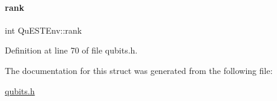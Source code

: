 \mbox{\label{structQuESTEnv_aa648bb336cf8598467cb62db00b9cee8}} 
\paragraph{\texorpdfstring{rank}{rank}}
{\footnotesize\ttfamily int Qu\+E\+S\+T\+Env\+::rank}



Definition at line 70 of file qubits.\+h.



The documentation for this struct was generated from the following file\+:\begin{DoxyCompactItemize}
\item 
\mbox{\hyperlink{qubits_8h}{qubits.\+h}}\end{DoxyCompactItemize}
